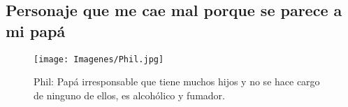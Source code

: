 \documentclass[A5,11pt]{article}
\begin{document}
        
    \subsection{Personaje que me cae mal porque se parece a mi papá}
        \begin{SCfigure}[1][h]
            \texttt{[image: Imagenes/Phil.jpg]}
            \caption{Phil: Papá irresponsable que tiene muchos hijos         y no se hace cargo de ninguno de ellos, es              alcohólico y fumador.}
        \end{SCfigure}
        
\end{document}
